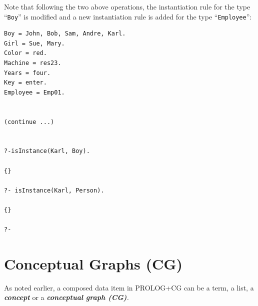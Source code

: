 \documentclass{book}
\begin{document}
Note that following the two above operations, the instantiation rule
for the type ``\texttt{Boy}'' is modified and a new instantiation rule
is added for the type ``\texttt{Employee}'':

\begin{verbatim}
Boy = John, Bob, Sam, Andre, Karl.
Girl = Sue, Mary.
Color = red.
Machine = res23.
Years = four.
Key = enter.
Employee = Emp01.


(continue ...)


?-isInstance(Karl, Boy).

{}

?- isInstance(Karl, Person).

{}

?-
\end{verbatim}



\section{Conceptual Graphs (CG)}\label{Sec:CG}

As noted earlier, a composed data item in PROLOG+CG can be a term,
a list, a {\bf {\it concept}} or a
{\it {\bf conceptual graph (CG)}.}
\end{document}

